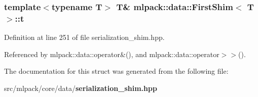 \subsubsection[{t}]{\setlength{\rightskip}{0pt plus 5cm}template$<$typename T$>$ T\& {\bf mlpack\+::data\+::\+First\+Shim}$<$ T $>$\+::t}\label{structmlpack_1_1data_1_1FirstShim_acbad0c5a84898c5e05c9dce76bc6a2ef}


Definition at line 251 of file serialization\+\_\+shim.\+hpp.



Referenced by mlpack\+::data\+::operator\&(), and mlpack\+::data\+::operator$>$$>$().



The documentation for this struct was generated from the following file\+:\begin{DoxyCompactItemize}
\item 
src/mlpack/core/data/{\bf serialization\+\_\+shim.\+hpp}\end{DoxyCompactItemize}
